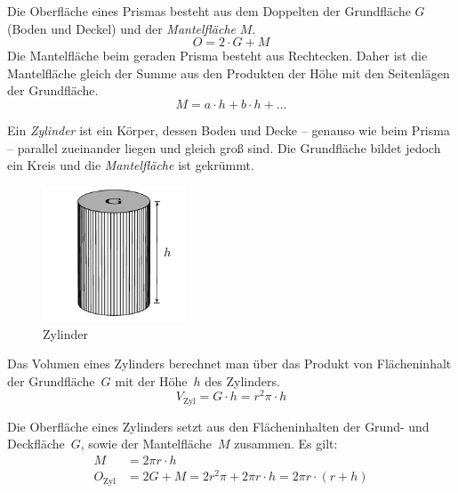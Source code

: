 \begin{regel}
 Die Oberfläche eines Prismas besteht aus dem Doppelten der Grundfläche \(G\) (Boden und Deckel) und der \emph{Mantelfläche} \(M\).
 \begin{equation*}
  O = 2\cdot G + M
 \end{equation*}
 Die Mantelfläche beim geraden Prisma besteht aus Rechtecken. Daher ist die Mantelfläche gleich der Summe aus den Produkten der Höhe mit den Seitenlägen der Grundfläche.
 \begin{equation*}
  M = a\cdot h + b\cdot h + \ldots
 \end{equation*}
\end{regel}

\begin{defi}[Zylinder]
 Ein \emph{Zylinder} ist ein Körper, dessen Boden und Decke -- genauso wie beim Prisma -- parallel zueinander liegen und gleich groß sind. Die Grundfläche bildet jedoch ein Kreis und die \emph{Mantelfläche} ist gekrümmt.
 \begin{figure}
  \begin{center}
\includegraphics[height=4cm]{./zylinder.pdf}
\caption{Zylinder}
\end{center}
 \end{figure}
\end{defi}

\begin{regel}
 Das Volumen eines Zylinders berechnet man über das Produkt von Flächeninhalt der Grundfläche~\(G\) mit der Höhe~\(h\) des Zylinders.
 \begin{equation*}
  V_{\text{Zyl}} = G\cdot h = r^2\pi \cdot h
 \end{equation*}
\end{regel}

\begin{regel}
 Die Oberfläche eines Zylinders setzt aus den Flächeninhalten der Grund- und Deckfläche~\(G\), sowie der Mantelfläche~\(M\) zusammen. Es gilt:
 \begin{align*}
  M &= 2\pi r \cdot h \\
  O_{\text{Zyl}} &= 2G + M = 2 r^2 \pi +  2\pi r \cdot h = 2\pi r\cdot ( r+h)
 \end{align*}

\end{regel}

